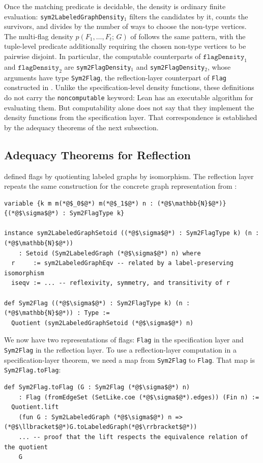 \documentclass[acmsmall,screen=true,acmthm=false]{acmart}
\newcommand{\den}[2]{p(#1;\,#2)}
\DeclareRobustCommand{\lean}[1]{{\def\_{\textunderscore\allowbreak}\texttt{#1}}}
\begin{document}
Once the matching predicate is decidable, the density is ordinary finite
evaluation: \lean{sym2LabeledGraphDensity}$_1$ filters the candidates by it,
counts the survivors, and divides by the number of ways to choose the non-type
vertices.  The multi-flag density \(\den{F_1,\ldots,F_t}{G}\) of
 follows the same pattern, with the
tuple-level predicate additionally requiring the chosen non-type vertices to be
pairwise disjoint.  In particular, the computable counterparts of
\(\mathtt{flagDensity}_1\) and \(\mathtt{flagDensity}_2\) are
\lean{sym2FlagDensity}$_1$ and \lean{sym2FlagDensity}$_2$, whose arguments have
type \lean{Sym2Flag}, the reflection-layer counterpart of \lean{Flag}
constructed in .  Unlike the specification-level
density functions, these definitions do not carry the \lean{noncomputable}
keyword: Lean has an executable algorithm for evaluating them.  But
computability alone does not say that they implement the density functions from
the specification layer.  That correspondence is established by the adequacy
theorems of the next subsection.

\subsection{Adequacy Theorems for Reflection}
\label{sec:reflection-adequacy}

 defined flags by quotienting labeled graphs by
isomorphism.
The reflection layer repeats the same construction for the concrete graph
representation from :
\begin{lstlisting}
variable {k m m(*@$_0$@*) m(*@$_1$@*) n : (*@$\mathbb{N}$@*)} {(*@$\sigma$@*) : Sym2FlagType k}

instance sym2LabeledGraphSetoid ((*@$\sigma$@*) : Sym2FlagType k) (n : (*@$\mathbb{N}$@*))
    : Setoid (Sym2LabeledGraph (*@$\sigma$@*) n) where
  r     := sym2LabeledGraphEqv -- related by a label-preserving isomorphism
  iseqv := ... -- reflexivity, symmetry, and transitivity of r

def Sym2Flag ((*@$\sigma$@*) : Sym2FlagType k) (n : (*@$\mathbb{N}$@*)) : Type :=
  Quotient (sym2LabeledGraphSetoid (*@$\sigma$@*) n)
\end{lstlisting}
We now have two representations of flags: \lean{Flag} in the specification
layer and \lean{Sym2Flag} in the reflection layer.  To use a reflection-layer
computation in a specification-layer theorem, we need a map from
\lean{Sym2Flag} to \lean{Flag}.  That map is \lean{Sym2Flag.toFlag}:
\begin{lstlisting}
def Sym2Flag.toFlag (G : Sym2Flag (*@$\sigma$@*) n)
    : Flag (fromEdgeSet (SetLike.coe (*@$\sigma$@*).edges)) (Fin n) :=
  Quotient.lift
    (fun G : Sym2LabeledGraph (*@$\sigma$@*) n => (*@$\llbracket$@*)G.toLabeledGraph(*@$\rrbracket$@*))
    ... -- proof that the lift respects the equivalence relation of the quotient
    G
\end{lstlisting}
\end{document}
